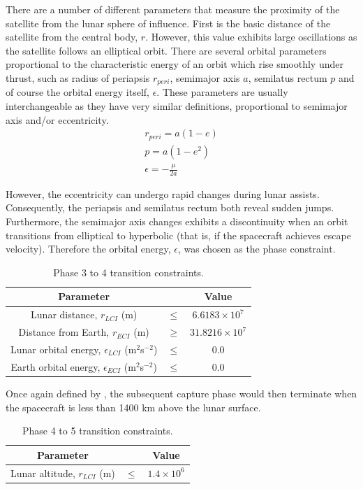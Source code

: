 There are a number of different parameters that measure the proximity of the satellite from the lunar sphere of influence. First is the basic distance of the satellite from the central body, $r$. However, this value exhibits large oscillations as the satellite follows an elliptical orbit. There are several orbital parameters proportional to the characteristic energy of an orbit which rise smoothly under thrust, such as radius of periapsis $r_{peri}$, semimajor axis $a$, semilatus rectum $p$ and of course the orbital energy itself, $\epsilon$. These parameters are usually interchangeable as they have very similar definitions, proportional to semimajor axis and/or eccentricity.
\begin{gather}
r_{peri} = a(1-e)\\
p = a(1-e^2)\\
\epsilon = -\frac{\mu}{2a}
\end{gather}

However, the eccentricity can undergo rapid changes during lunar assists. Consequently, the periapsis and semilatus rectum both reveal sudden jumps. Furthermore, the semimajor axis changes exhibits a discontinuity when an orbit transitions from elliptical to hyperbolic (that is, if the spacecraft achieves escape velocity). Therefore the orbital energy, $\epsilon$, was chosen as the phase constraint.

\begin{table}[h]
\caption{Phase 3 to 4 transition constraints.}
\label{tab:Phase-3-4-constraints}
\centering
\begin{tabular} {ccc}\toprule
Parameter & & Value\\\midrule
Lunar distance, $r_{LCI}$ (m) &$\le$& $6.6183\times 10^7$\\\midrule
Distance from Earth, $r_{ECI}$ (m) &$\ge$& $31.8216\times 10^7$\\\midrule
Lunar orbital energy, $\epsilon_{LCI}$ (m$^2$s$^{-2}$) &$\le$& 0.0 \\\midrule
Earth orbital energy, $\epsilon_{ECI}$ (m$^2$s$^{-2}$) &$\le$& 0.0 \\\bottomrule
\end{tabular}
\end{table}

Once again defined by \citeauthor{Roeser2006}, the subsequent capture phase would then terminate when the spacecraft is less than 1400 km above the lunar surface.

\begin{table}[h]
\caption{Phase 4 to 5 transition constraints.}
\label{tab:Phase-4-5-constraints}
\centering
\begin{tabular} {ccc}\toprule
Parameter && Value\\\midrule
Lunar altitude, $r_{LCI}$ (m) &$\le$& $1.4\times 10^6$\\\bottomrule
\end{tabular}
\end{table}

